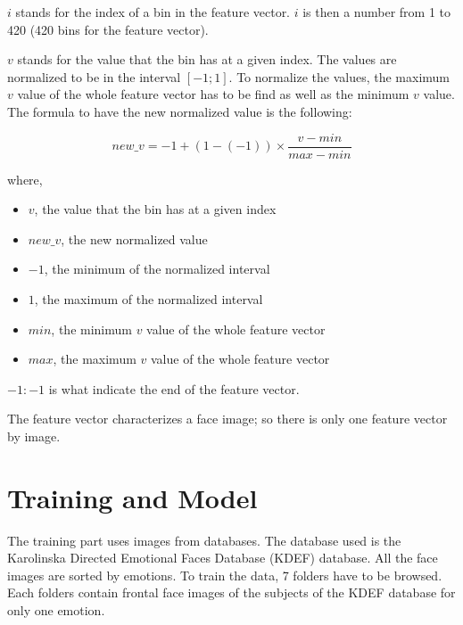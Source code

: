 \vspace{\baselineskip}
\noindent $ i $ stands for the index of a bin in the feature vector. $ i $ is then a number from 1 to 420 (420 bins for the feature vector).
\newline

\vspace{\baselineskip}
\noindent $ v $ stands for the value that the bin has at a given index. The values are normalized to be in the interval $ [-1;1] $. To normalize the values, the maximum $ v $ value of the whole feature vector has to be find as well as the minimum $ v $ value. The formula to have the new normalized value is the following:
\newline

\begin{equation}
new\_v = -1 + (1 - (-1))\times\frac{v - min}{max - min}
\end{equation}

\noindent where,

\begin{itemize}
  \item $ v $, the value that the bin has at a given index
  \item $ new\_v $, the new normalized value
  \item $ -1 $, the minimum of the normalized interval
  \item $ 1 $, the maximum of the normalized interval
  \item $ min $, the minimum $ v $ value of the whole feature vector
  \item $ max $, the maximum $ v $ value of the whole feature vector
\end{itemize}

\vspace{\baselineskip}
\noindent $ -1:-1 $ is what indicate the end of the feature vector.
\newline

\vspace{\baselineskip}
\noindent The feature vector characterizes a face image; so there is only one feature vector by image.
\newline

\section{Training and Model}

\vspace{\baselineskip}
\noindent The training part uses images from databases. The database used is the Karolinska Directed Emotional Faces Database (KDEF) database. All the face images are sorted by emotions. To train the data, 7 folders have to be browsed. Each folders contain frontal face images of the subjects of the KDEF database for only one emotion.
\newline

